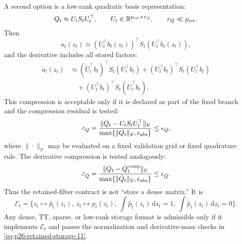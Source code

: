 \documentclass[11pt]{article}
\numberwithin{equation}{section}
\newcommand{\R}{\mathbb R}
\newcommand{\dd}{\,\mathrm d}
\begin{document}
A second option is a low-rank quadratic basis representation:
\begin{equation}
    Q_t\approx U_t S_t U_t^\top,
    \qquad
    U_t\in\R^{p_{\rm ret}\times r_Q},
    \qquad
    r_Q\ll p_{\rm ret}.
    \label{eq:p26-retained-storage-6}
\end{equation}
Then
\begin{equation}
    a_t(z_t)
    \approx
    \left(U_t^\top b_t(z_t)\right)^\top
    S_t
    \left(U_t^\top b_t(z_t)\right),
    \label{eq:p26-retained-storage-7}
\end{equation}
and the derivative includes all stored factors:
\begin{equation}
\begin{aligned}
    \dot a_t(z_t)
    &\approx
    (\dot U_t^\top b_t)^\top S_t(U_t^\top b_t)
    +(U_t^\top b_t)^\top \dot S_t(U_t^\top b_t)\\
    &\quad+
    (U_t^\top b_t)^\top S_t(\dot U_t^\top b_t).
\end{aligned}
    \label{eq:p26-retained-storage-8}
\end{equation}
This compression is acceptable only if it is declared as part of the fixed
branch and the compression residual is tested:
\begin{equation}
    \varepsilon_Q
    =
    \frac{\|Q_t-U_tS_tU_t^\top\|_{\mathcal V}}
         {\max\{\|Q_t\|_{\mathcal V},\epsilon_{\rm abs}\}}
    \le \epsilon_Q,
    \label{eq:p26-retained-storage-9}
\end{equation}
where \(\|\cdot\|_{\mathcal V}\) may be evaluated on a fixed validation grid
or fixed quadrature rule.  The derivative compression is tested analogously:
\begin{equation}
    \varepsilon_{\dot Q}
    =
    \frac{\|\dot Q_t-\dot Q_t^{\rm comp}\|_{\mathcal V}}
         {\max\{\|\dot Q_t\|_{\mathcal V},\epsilon_{\rm abs}\}}
    \le \epsilon_{\dot Q}.
    \label{eq:p26-retained-storage-10}
\end{equation}
Thus the retained-filter contract is not ``store a dense matrix.''  It is
\begin{equation}
    \mathcal E_t
    =
    \{z_t\mapsto \widehat p_t(z_t),\
      z_t\mapsto \dot{\widehat p}_t(z_t),\
      \int\widehat p_t(z_t)\dd z_t=1,\
      \int\dot{\widehat p}_t(z_t)\dd z_t=0\}.
    \label{eq:p26-retained-storage-11}
\end{equation}
Any dense, TT, sparse, or low-rank storage format is admissible only if it
implements \(\mathcal E_t\) and passes the normalization and derivative-mass
checks in \eqref{eq:p26-retained-storage-11}.
\end{document}
